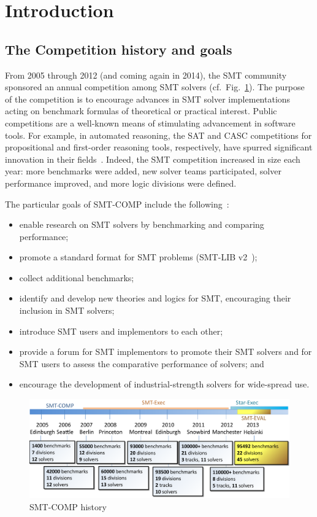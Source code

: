\documentclass[smallcondensed]{svjour3}
\begin{document}
\section{Introduction}

\subsection{The Competition history and goals}
From 2005 through 2012 (and coming again in 2014), the SMT community
sponsored an annual competition among SMT solvers
(cf.\ Fig.~\ref{Fig:history}).  The purpose of the competition is to
encourage advances in SMT solver implementations acting on benchmark
formulas of theoretical or practical interest.  Public competitions
are a well-known means of stimulating advancement in software tools.
For example, in automated reasoning, the SAT and CASC competitions for
propositional and first-order reasoning tools, respectively, have
spurred significant innovation in their fields~\cite{leberre+03,PSS02}.  Indeed, the SMT competition increased in
size each year: more benchmarks were added, new solver teams
participated, solver performance improved, and more logic divisions were defined.

The particular goals of SMT-COMP include the following~\cite{smtcompweb}:
\begin{itemize}[noitemsep]
\item enable research on SMT solvers by benchmarking and comparing performance;
\item promote a standard format for SMT problems (SMT-LIB v2~\cite{BarST-SMT-10});
\item collect additional benchmarks;
\item identify and develop new theories and logics for SMT, encouraging their inclusion in SMT solvers;
\item introduce SMT users and implementors to each other;
\item provide a forum for SMT implementors to promote their SMT solvers and for SMT users to assess the comparative performance of solvers; and
\item encourage the development of industrial-strength solvers for wide-spread use.
\end{itemize}

\begin{figure}
\centering
\includegraphics[width=\columnwidth]{SMTCOMP-History}
\caption{SMT-COMP history}
\label{Fig:history}
\end{figure}
\end{document}

